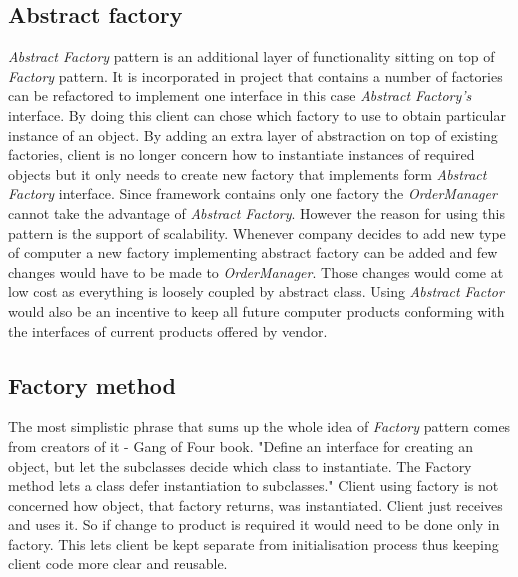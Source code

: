 \documentclass[pdftex,11pt,a4paper]{article}
\begin{document}
\subsection{Abstract factory}
\emph{Abstract Factory} pattern is an additional layer of functionality sitting on top of \emph{Factory} pattern. It is incorporated in project that contains a number of factories can be refactored to implement one interface in this case \emph{Abstract Factory's} interface. By doing this client can chose which factory to use to obtain particular instance of an object. By adding an extra layer of abstraction on top of existing factories, client is no longer concern  how to instantiate instances of required objects but it only needs to create new factory that implements form \emph{Abstract Factory} interface.
Since framework contains only one factory the \emph{OrderManager} cannot take the advantage of \emph{Abstract Factory}. However the reason for using this pattern is the support of scalability. Whenever company decides to add new type of computer a new factory implementing abstract factory can be added and few changes would have to be made to \emph{OrderManager}. Those changes would come at low cost as everything is loosely coupled by abstract class. Using \emph{Abstract Factor} would also be an incentive to keep all future computer products conforming with the interfaces of current products offered by vendor.

\subsection{Factory method}
The most simplistic phrase that sums up the whole idea of \emph{Factory} pattern comes from creators of it - Gang of Four book.
"Define an interface for creating an object, but let the subclasses decide which class to instantiate. The Factory method lets a class defer instantiation to subclasses."\cite{website:GOF_wika}
Client using factory is not concerned how object, that factory returns, was instantiated. Client just receives and uses it. So if change to product is required it would need to be done only in factory. This lets client be kept separate from initialisation process thus keeping client code more clear and reusable.
\end{document}
